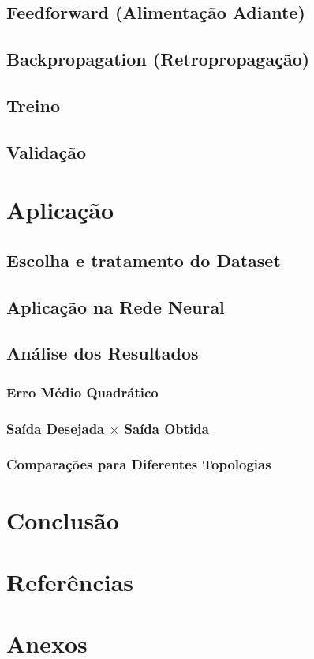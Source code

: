 \documentclass[12pt,a4paper]{article}
\begin{document}
\subsection{Feedforward (Alimentação Adiante)}

\subsection{Backpropagation (Retropropagação)}

\subsection{Treino}

\subsection{Validação}

\section{Aplicação}
\subsection{Escolha e tratamento do Dataset}
\subsection{Aplicação na Rede Neural}
\subsection{Análise dos Resultados}
\subsubsection{Erro Médio Quadrático}
\subsubsection{Saída Desejada $\times$ Saída Obtida}
\subsubsection{Comparações para Diferentes Topologias}
\section{Conclusão}
\section{Referências}
\section{Anexos}
\end{document}
